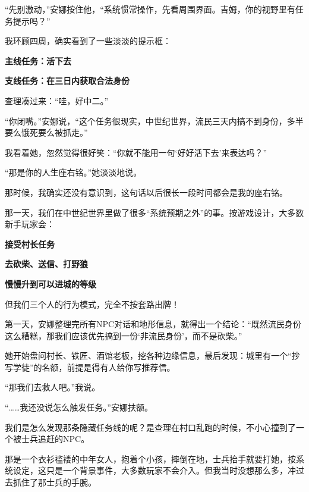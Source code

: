 “先别激动，”安娜按住他，“系统惯常操作，先看周围界面。吉姆，你的视野里有任务提示吗？”

我环顾四周，确实看到了一些淡淡的提示框：

\begin{center}
\textbf{主线任务：活下去}
\end{center}

\begin{center}
\textbf{支线任务：在三日内获取合法身份}
\end{center}

查理凑过来：“哇，好中二。”

“你闭嘴。”安娜说，“这个任务很现实，中世纪世界，流民三天内搞不到身份，多半要么饿死要么被抓走。”

我看着她，忽然觉得很好笑：“你就不能用一句‘好好活下去’来表达吗？”

“那是你的人生座右铭。”她淡淡地说。

那时候，我确实还没有意识到，这句话以后很长一段时间都会是我的座右铭。

\SceneBreak

那一天，我们在中世纪世界里做了很多“系统预期之外”的事。按游戏设计，大多数新手玩家会：

\begin{center}
\textbf{接受村长任务}
\end{center}

\begin{center}
\textbf{去砍柴、送信、打野狼}
\end{center}

\begin{center}
\textbf{慢慢升到可以进城的等级}
\end{center}

但我们三个人的行为模式，完全不按套路出牌！

第一天，安娜整理完所有NPC对话和地形信息，就得出一个结论：“既然流民身份这么糟糕，那我们应该优先搞到一份‘非流民身份’，而不是砍柴。”

她开始盘问村长、铁匠、酒馆老板，挖各种边缘信息，最后发现：城里有一个“抄写学徒”的名额，前提是得有人给你写推荐信。

“那我们去救人吧。”我说。

“……我还没说怎么触发任务。”安娜扶额。

我们是怎么发现那条隐藏任务线的呢？是查理在村口乱跑的时候，不小心撞到了一个被士兵追赶的NPC。

那是一个衣衫褴褛的中年女人，抱着个小孩，摔倒在地，士兵抬手就要打她，按系统设定，这只是一个背景事件，大多数玩家不会介入。但我当时没想那么多，冲过去抓住了那士兵的手腕。

